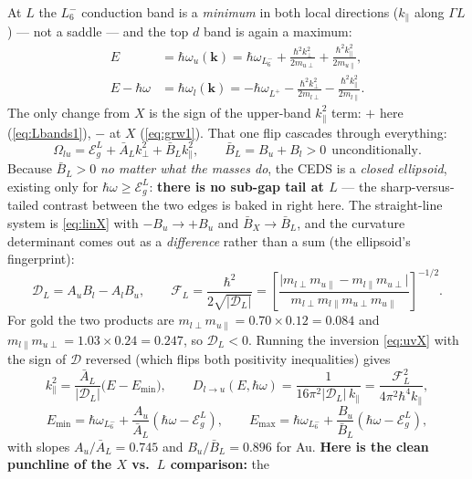 \documentclass[11pt,a4paper]{article}
\numberwithin{equation}{section}
\newcommand{\hw}{\hbar\omega}
\newcommand{\EgL}{\mathcal{E}_g^{L}}
\newcommand{\cD}{\mathcal{D}}
\newcommand{\cF}{\mathcal{F}}
\newcommand{\BX}{\bar{B}_X}
\newcommand{\AL}{\bar{A}_L}
\newcommand{\BL}{\bar{B}_L}
\newcommand{\kperp}{k_{\perp}}
\newcommand{\kpar}{k_{\parallel}}
\newcommand{\wLsix}{\hbar\omega_{L_6^-}}
\newcommand{\wLplus}{\hbar\omega_{L^+}}
\begin{document}
At $L$ the $L_6^-$ conduction band is a \emph{minimum} in both local
directions ($\kpar$ along $\Gamma L$) --- not a saddle --- and the top
$d$ band is again a maximum:
\begin{align}
E&=\hbar\omega_u(\mathbf k)
=\wLsix+\frac{\hbar^2\kperp^2}{2m_{u\perp}}
       +\frac{\hbar^2\kpar^2}{2m_{u\parallel}},
\label{eq:Lbands1}\\[2pt]
E-\hw&=\hbar\omega_l(\mathbf k)
=-\wLplus-\frac{\hbar^2\kperp^2}{2m_{l\perp}}
         -\frac{\hbar^2\kpar^2}{2m_{l\parallel}} .
\label{eq:Lbands2}
\end{align}
The only change from $X$ is the sign of the upper-band $\kpar^2$ term:
$+$ here (\eqref{eq:Lbands1}), $-$ at $X$ (\eqref{eq:grw1}). That one
flip cascades through everything:
\begin{equation}
\Omega_{lu}=\EgL+\AL\kperp^2+\BL\kpar^2,
\qquad \BL=B_u+B_l>0\ \ \text{unconditionally.}
\end{equation}
Because $\BL>0$ \emph{no matter what the masses do}, the CEDS is a
\emph{closed ellipsoid}, existing only for $\hw\ge\EgL$: \textbf{there
is no sub-gap tail at $L$} --- the sharp-versus-tailed contrast
between the two edges is baked in right here. The straight-line system
is \eqref{eq:linX} with $-B_u\to+B_u$ and $\BX\to\BL$, and the
curvature determinant comes out as a \emph{difference} rather than a
sum (the ellipsoid's fingerprint):
\begin{equation}
\cD_L=A_uB_l-A_lB_u,
\qquad
\cF_L=\frac{\hbar^2}{2\sqrt{|\cD_L|}}
=\left[\frac{\bigl|m_{l\perp}m_{u\parallel}
             -m_{l\parallel}m_{u\perp}\bigr|}
{m_{l\perp}m_{l\parallel}m_{u\perp}m_{u\parallel}}\right]^{-1/2}.
\label{eq:DL}
\end{equation}
For gold the two products are
$m_{l\perp}m_{u\parallel}=0.70\times0.12=0.084$ and
$m_{l\parallel}m_{u\perp}=1.03\times0.24=0.247$, so
$\boxed{\cD_L<0}$. Running the inversion \eqref{eq:uvX} with the sign
of $\cD$ reversed (which flips both positivity inequalities) gives
\begin{equation}
\kpar^2=\frac{\AL}{|\cD_L|}\bigl(E-E_{\min}\bigr),
\qquad
D_{l\to u}(E,\hw)
=\frac{1}{16\pi^2|\cD_L|\,\kpar}
=\frac{\cF_L^2}{4\pi^2\hbar^4\kpar},
\label{eq:DLd}
\end{equation}
\begin{equation}
E_{\min}=\wLsix+\frac{A_u}{\AL}(\hw-\EgL),
\qquad
E_{\max}=\wLsix+\frac{B_u}{\BL}(\hw-\EgL),
\label{eq:Lwindow}
\end{equation}
with slopes $A_u/\AL=0.745$ and $B_u/\BL=0.896$ for Au. \textbf{Here
is the clean punchline of the $X$ vs.\ $L$ comparison:} the
\end{document}
